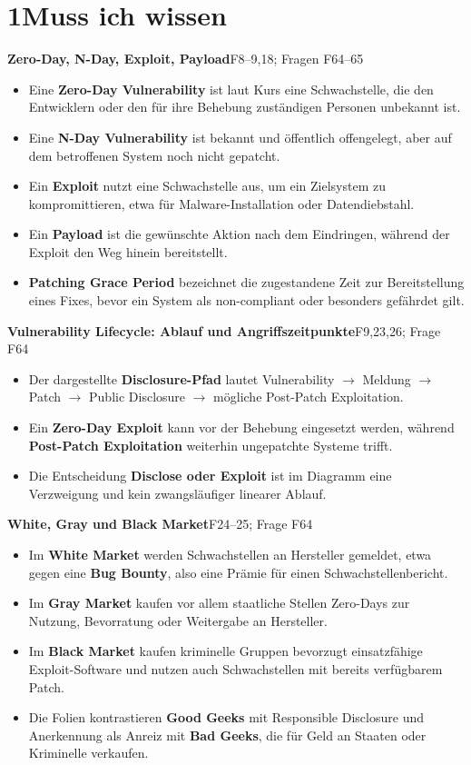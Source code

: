 \documentclass[11pt,a4paper]{article}
\newcommand{\block}[2]{\par\vspace{5pt}\textbf{#1}\hfill{\scriptsize #2}\par\nopagebreak}
\begin{document}
\section*{1\quad Muss ich wissen}
\block{Zero-Day, N-Day, Exploit, Payload}{F8--9,18; Fragen F64--65}
\begin{itemize}
\item Eine \textbf{Zero-Day Vulnerability} ist laut Kurs eine Schwachstelle, die den Entwicklern oder den für ihre Behebung zuständigen Personen unbekannt ist.
\item Eine \textbf{N-Day Vulnerability} ist bekannt und öffentlich offengelegt, aber auf dem betroffenen System noch nicht gepatcht.
\item Ein \textbf{Exploit} nutzt eine Schwachstelle aus, um ein Zielsystem zu kompromittieren, etwa für Malware-Installation oder Datendiebstahl.
\item Ein \textbf{Payload} ist die gewünschte Aktion nach dem Eindringen, während der Exploit den Weg hinein bereitstellt.
\item \textbf{Patching Grace Period} bezeichnet die zugestandene Zeit zur Bereitstellung eines Fixes, bevor ein System als non-compliant oder besonders gefährdet gilt.
\end{itemize}
\block{Vulnerability Lifecycle: Ablauf und Angriffszeitpunkte}{F9,23,26; Frage F64}
\begin{itemize}
\item Der dargestellte \textbf{Disclosure-Pfad} lautet Vulnerability $\rightarrow$ Meldung $\rightarrow$ Patch $\rightarrow$ Public Disclosure $\rightarrow$ mögliche Post-Patch Exploitation.
\item Ein \textbf{Zero-Day Exploit} kann vor der Behebung eingesetzt werden, während \textbf{Post-Patch Exploitation} weiterhin ungepatchte Systeme trifft.
\item Die Entscheidung \textbf{Disclose oder Exploit} ist im Diagramm eine Verzweigung und kein zwangsläufiger linearer Ablauf.
\end{itemize}
\block{White, Gray und Black Market}{F24--25; Frage F64}
\begin{itemize}
\item Im \textbf{White Market} werden Schwachstellen an Hersteller gemeldet, etwa gegen eine \textbf{Bug Bounty}, also eine Prämie für einen Schwachstellenbericht.
\item Im \textbf{Gray Market} kaufen vor allem staatliche Stellen Zero-Days zur Nutzung, Bevorratung oder Weitergabe an Hersteller.
\item Im \textbf{Black Market} kaufen kriminelle Gruppen bevorzugt einsatzfähige Exploit-Software und nutzen auch Schwachstellen mit bereits verfügbarem Patch.
\item Die Folien kontrastieren \textbf{Good Geeks} mit Responsible Disclosure und Anerkennung als Anreiz mit \textbf{Bad Geeks}, die für Geld an Staaten oder Kriminelle verkaufen.
\end{itemize}
\end{document}
